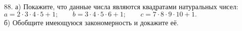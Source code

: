 88. а) Покажите, что данные числа являются квадратами натуральных чисел:\\
$a=2\cdot3\cdot4\cdot5+1;\qquad b=3\cdot4\cdot5\cdot6+1;\qquad c=7\cdot8\cdot9\cdot10+1.$\\
б) Обобщите имеющуюся закономерность и докажите её.\\
